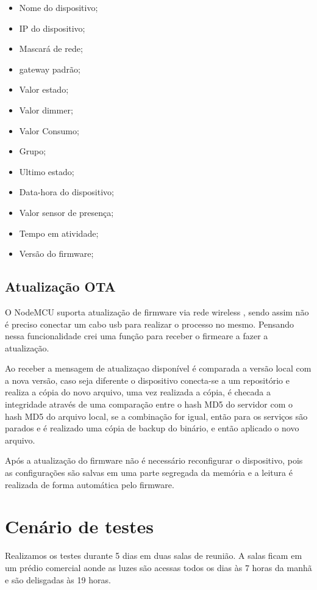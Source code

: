 \documentclass[openright]{normas-utf-tex} %
\begin{document}
\begin{itemize}
    \item Nome do dispositivo;
    \item IP do dispositivo;
    \item Mascará de rede;
    \item gateway padrão;
    \item Valor estado;
    \item Valor dimmer;
    \item Valor Consumo;
    \item Grupo;
    \item Ultimo estado;
    \item Data-hora do dispositivo;
    \item Valor sensor de presença;
    \item Tempo em atividade;
    \item Versão do firmware;
\end{itemize}

\subsection{Atualização OTA}

O NodeMCU suporta atualização de firmware via rede wireless  \cite{espressif}, sendo assim não é preciso conectar um cabo usb para realizar o processo no mesmo. 
Pensando nessa funcionalidade crei uma função para receber o firmeare a fazer a atualização.

Ao receber a mensagem de atualizaçao disponível é comparada a versão local com a nova versão, caso seja diferente o dispositivo conecta-se a um repositório e realiza a cópia do novo arquivo, uma vez realizada a cópia, é checada a integridade através de uma comparação entre o hash MD5 do servidor com o hash MD5 do arquivo local, se a combinação for igual, então para os serviços são parados e é realizado uma cópia de backup do binário, e então aplicado o novo arquivo.

Após a atualização do firmware não é necessário reconfigurar o dispositivo, pois as configurações são salvas em uma parte segregada da memória e a leitura é realizada de forma automática pelo firmware.

\section{Cenário de testes}
Realizamos os testes durante 5 dias em duas salas de reunião. A salas ficam em um prédio comercial aonde as luzes são acessas todos os dias às 7 horas da manhã e são delisgadas às 19 horas.
\end{document}
